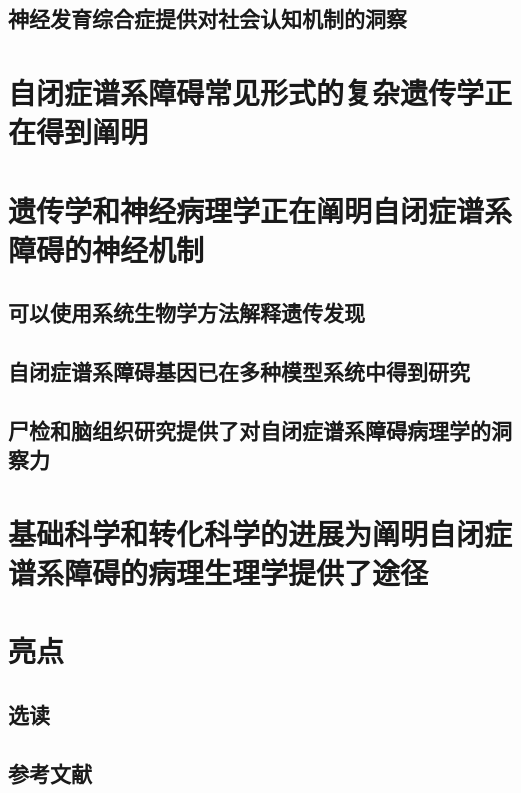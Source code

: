 \subsection{神经发育综合症提供对社会认知机制的洞察}

\section{自闭症谱系障碍常见形式的复杂遗传学正在得到阐明}

\section{遗传学和神经病理学正在阐明自闭症谱系障碍的神经机制}
\subsection{可以使用系统生物学方法解释遗传发现}
\subsection{自闭症谱系障碍基因已在多种模型系统中得到研究}
\subsection{尸检和脑组织研究提供了对自闭症谱系障碍病理学的洞察力}

\section{基础科学和转化科学的进展为阐明自闭症谱系障碍的病理生理学提供了途径}

\section{亮点}
\subsection{选读}
\subsection{参考文献}
